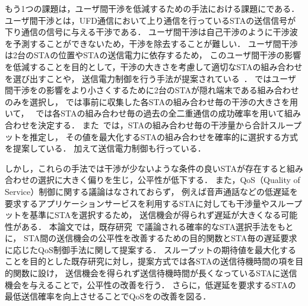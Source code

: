 \documentclass[master]{kuisthesis}		%
\begin{document}
\par
もう1つの課題は，ユーザ間干渉を低減するための手法における課題にである．
ユーザ間干渉とは，UFD通信において上り通信を行っているSTAの送信信号が下り通信の信号に与える干渉である．
ユーザ間干渉は自己干渉のように干渉波を予測することができないため，干渉を除去することが難しい．
ユーザ間干渉は2台のSTAの位置やSTAの送信電力に依存するため，
このユーザ間干渉の影響を低減することを目的として，干渉の大きさを考慮して適切なSTAの組み合わせを選び出すことや，
送信電力制御を行う手法が提案されている~\cite{contra,janus, fdmac3, goyal,promac}．
\cite{fdmac3}ではユーザ間干渉をの影響をより小さくするために2台のSTAが隠れ端末である組み合わせのみを選択し，
\cite{janus,goyal}では事前に収集した各STAの組み合わせ毎の干渉の大きさを用いて，
~\cite{contra}では各STAの組み合わせ毎の過去の全二重通信の成功確率を用いて組み合わせを決定する．
また~\cite{promac}では，STAの組み合わせ毎の干渉量から合計スループットを推定し，
その値を最大化するSTAの組み合わせを確率的に選択する方式を提案している．
加えて送信電力制御も行っている．
\par
しかし，これらの手法では干渉が少ないような条件の良いSTAが存在すると組み合わせの選択に大きく偏りを生じ，公平性が低下する．
また，QoS（Quality of Service）制御に関する議論はなされておらず，
例えば音声通話などの低遅延を要求するアプリケーションサービスを利用するSTAに対しても干渉量やスループットを基準にSTAを選択するため，
送信機会が得られず遅延が大きくなる可能性がある．
本論文では，既存研究~\cite{promac}で議論される確率的なSTA選択手法をもとに，
STA間の送信機会の公平性を改善するための目的関数とSTA毎の遅延要求に応じたQoS制御手法に関して提案する．
スループットの期待値を最大化することを目的とした既存研究に対し，提案方式では各STAの送信待機時間の項を目的関数に設け，
送信機会を得られず送信待機時間が長くなっているSTAに送信機会を与えることで，公平性の改善を行う．
さらに，低遅延を要求するSTAの最低送信確率を向上させることでQoSをの改善を図る．
\end{document}
